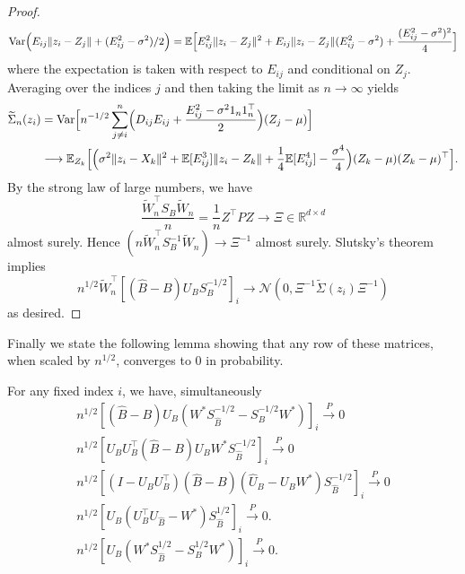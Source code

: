 \begin{proof}
$$
\mathrm{Var}\Bigl(E_{ij} \|z_i - Z_j\| + (E_{ij}^2 - \sigma^2)/2\Bigr) = \mathbb{E}\Bigl[ E_{ij}^2 \|z_i - Z_j\|^{2} + E_{ij} \|z_i - Z_j\| (E_{ij}^2 - \sigma^2) + \frac{(E_{ij}^2 - \sigma^2)^2}{4}\Bigr]$$
where the expectation is taken with respect to $E_{ij}$ and conditional on $Z_j$. Averaging over the indices $j$ and then taking the limit as $n \rightarrow \infty$ yields
\begin{equation*}
\begin{split}
\widetilde{\Sigma}_n(z_i) &= \mathrm{Var}\Bigl[n^{-1/2} \sum_{j \neq i}^{n} \Bigl(D_{ij} E_{ij} + \frac{E_{ij}^2 - \sigma^2 1_n 1_n^{\top}}{2} \Bigr) (Z_j - \mu)\Bigr] \\ & \longrightarrow
\mathbb{E}_{Z_k}\Bigl[\Bigl(\sigma^2 \|z_i - X_k\|^2 + \mathbb{E}[E_{ij}^3] \| z_i - Z_k\| + \frac{1}{4} \mathbb{E}[E_{ij}^4] - \frac{\sigma^4}{4}\Bigr) (Z_k- {\mu}) (Z_k - {\mu})^\top\Bigr].
\end{split}
\end{equation*}
By the strong law of large numbers, we have
  $$\frac{\tilde{W}_n^\top S_B \tilde{W}_n}{n} = \frac{1}{n} Z^\top P Z \rightarrow \Xi \in \mathbb{R}^{d \times d}$$ almost surely. Hence $(n \tilde{W}_n^{\top} S_B^{-1} \tilde{W}_n) \rightarrow {\Xi}^{-1}$ almost surely. Slutsky's theorem implies $$ n^{1/2} \tilde{W}_n^\top [(\hat{B} - B) U_B S_B^{-1/2}]_{i} \longrightarrow \mathcal{N}(0, {\Xi}^{-1} \widetilde{\Sigma}(z_i) {\Xi}^{-1})$$
  as desired.  
\end{proof}  

Finally we state the following lemma showing that any row of these matrices, when scaled by $n^{1/2}$, converges to $0$ in probability. 
\begin{lemma}
\label{appthm4}
For any fixed index $i$, we have, simultaneously
  \begin{gather} 
  \label{eq:1}
    n^{1/2} [(\hat{B} - B) U_B (W^{*} S_{\hat{B}}^{-1/2} - S_B^{-1/2} W^{*})]_{i} \overset{P}{\to} 0 \\
 \label{eq:2}
    n^{1/2} [ U_B U_B^{\top} (\hat{B} - B) U_B W^{*} S_{\hat{B}}^{-1/2}]_{i} \overset{P}{\to} 0 \\
 \label{eq:3}
    n^{1/2} [ (I -U_B U_B^{\top}) (\hat{B} - B) (\hat{U}_B - U_B W^*) S_{\hat{B}}^{-1/2}]_{i} \overset{P}{\to} 0 \\
 \label{eq:4}
 n^{1/2}[U_B (U_B^{\top} U_{\hat{B}} - W^*) S_{\hat{B}}^{1/2}]_{i}  \overset{P}{\to} 0. \\
\label{eq:5}
n^{1/2}[U_B (W^{*} S_{\hat{B}}^{1/2} - S_B^{1/2} W^{*})]_{i} \overset{P}{\to} 0.
  \end{gather}
\end{lemma}

